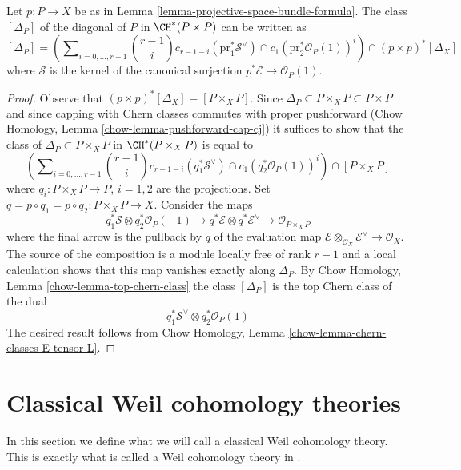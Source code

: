 \begin{lemma}
\label{lemma-diagonal-projective-bundle}
Let $p : P \to X$ be as in Lemma \ref{lemma-projective-space-bundle-formula}.
The class $[\Delta_P]$ of the diagonal of $P$ in $\CH^*(P \times P)$
can be written
as
$$
[\Delta_P] =
\left(\sum\nolimits_{i = 0, \ldots, r - 1}
{r - 1 \choose i} c_{r - 1 - i}(\text{pr}_1^*\mathcal{S}^\vee) \cap
c_1(\text{pr}_2^*\mathcal{O}_P(1))^i\right)
\cap
(p \times p)^*[\Delta_X]
$$
where $\mathcal{S}$ is the kernel of the canonical surjection
$p^*\mathcal{E} \to \mathcal{O}_P(1)$.
\end{lemma}

\begin{proof}
Observe that $(p \times p)^*[\Delta_X] = [P \times_X P]$.
Since $\Delta_P \subset P \times_X P \subset P \times P$
and since capping with Chern classes commutes with proper pushforward
(Chow Homology, Lemma \ref{chow-lemma-pushforward-cap-cj})
it suffices to show that the class of
$\Delta_P \subset P \times_X P$ in $\CH^*(P \times_X P)$
is equal to
$$
\left(\sum\nolimits_{i = 0, \ldots, r - 1}
{r - 1 \choose i} c_{r - 1 - i}(q_1^*\mathcal{S}^\vee) \cap
c_1(q_2^*\mathcal{O}_P(1))^i\right)
\cap
[P \times_X P]
$$
where $q_i : P \times_X P \to P$, $i = 1, 2$ are the projections.
Set $q = p \circ q_1 = p \circ q_2 : P \times_X P \to X$.
Consider the maps
$$
q_1^*\mathcal{S} \otimes q_2^*\mathcal{O}_P(-1) \to
q^*\mathcal{E} \otimes q^*\mathcal{E}^\vee \to
\mathcal{O}_{P \times_X P}
$$
where the final arrow is the pullback by $q$ of the evaluation map
$\mathcal{E} \otimes_{\mathcal{O}_X} \mathcal{E}^\vee \to \mathcal{O}_X$.
The source of the composition is a module locally free of rank $r - 1$
and a local calculation shows that this map vanishes exactly along
$\Delta_P$. By Chow Homology, Lemma \ref{chow-lemma-top-chern-class}
the class $[\Delta_P]$ is the top Chern class of the dual
$$
q_1^*\mathcal{S}^\vee \otimes q_2^*\mathcal{O}_P(1)
$$
The desired result follows from Chow Homology, Lemma
\ref{chow-lemma-chern-classes-E-tensor-L}.
\end{proof}








\section{Classical Weil cohomology theories}
\label{section-axioms-classical}

\noindent
In this section we define what we will call a classical Weil cohomology
theory. This is exactly what is called a Weil cohomology theory in
\cite[Section 1.2]{Kleiman-cycles}.

